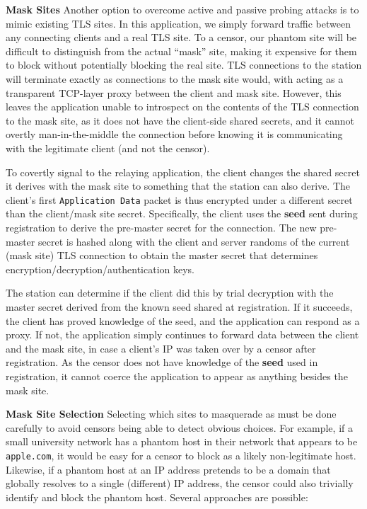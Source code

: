 \documentclass[sigconf]{acmart}
\renewcommand{\paragraph}[1]{\smallskip\noindent\textbf{#1\quad}}
\begin{document}
\paragraph{Mask Sites}\label{sec:mask-sites}
Another option to overcome active and passive probing attacks is to mimic existing TLS sites.
In this application, we simply forward traffic between any connecting clients
and a real TLS site. To a censor, our phantom site
will be difficult to distinguish from the actual ``mask'' site, making it expensive for
them to block without potentially blocking the real site. TLS connections to the
\scheme station will terminate exactly as connections to the mask site would, with
\scheme acting as a transparent TCP-layer proxy between the client and mask site.
However, this leaves the application unable to introspect on the contents of the
TLS connection to the mask site, as it does not have the client-side shared
secrets, and it cannot overtly man-in-the-middle the connection before knowing
it is communicating with the legitimate client (and not the censor).


To covertly signal to the relaying application, the client changes the shared secret
it derives with the mask site to something that the \scheme station can also derive. The client's first
\texttt{Application Data} packet is thus encrypted under a different secret than
the client/mask site secret. Specifically, the client uses the \textbf{seed}
sent during registration to derive the pre-master secret for the connection.
The new pre-master secret is hashed along with the client and server randoms of the current
(mask site) TLS connection to obtain the master secret that determines
encryption/decryption/authentication keys.

The \scheme station can determine if the client did this by trial decryption with
the master secret derived from the known seed shared at registration. If it succeeds, the
client has proved knowledge of the seed, and the application can
respond as a proxy. If not, the application simply continues to forward data
between the client and the mask site, in case a client's IP was taken over by
a censor after registration. As the censor does not have knowledge of
the \textbf{seed} used in registration, it cannot coerce the application to
appear as anything besides the mask site.

\paragraph{Mask Site Selection}
Selecting which sites to masquerade as must be done carefully to avoid censors
being able to detect obvious choices. For example, if a small university network
has a phantom host in their network that appears to be \texttt{apple.com}, it
would be easy for a censor to block as a likely non-legitimate host. Likewise,
if a phantom host at an IP address pretends to be a domain that
globally resolves to a single (different) IP address, the censor could also trivially
identify and block the phantom host.
Several approaches are possible:
\end{document}
